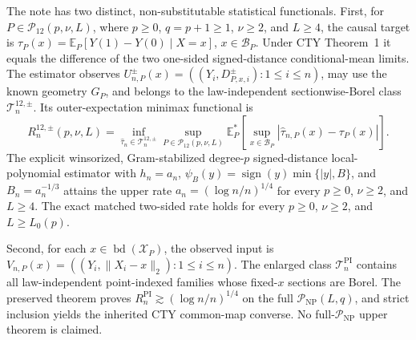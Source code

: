 The note has two distinct, non-substitutable statistical functionals.  First, for \(P\in\mathcal P_{12}(p,\nu,L)\), where \(p\geq0\), \(q=p+1\geq1\), \(\nu\geq2\), and \(L\geq4\), the causal target is \(\tau_P(x)=\mathbb E_P[Y(1)-Y(0)\mid X=x]\), \(x\in\mathcal B_P\).  Under CTY Theorem~1 it equals the difference of the two one-sided signed-distance conditional-mean limits.  The estimator observes \(U^{\pm}_{n,P}(x)=((Y_i,D^{\pm}_{P,x,i}):1\leq i\leq n)\), may use the known geometry \(G_P\), and belongs to the law-independent sectionwise-Borel class \(\mathcal T_n^{12,\pm}\).  Its outer-expectation minimax functional is
\[
 R_n^{12,\pm}(p,\nu,L)=\inf_{\widehat\tau_n\in\mathcal T_n^{12,\pm}}
 \sup_{P\in\mathcal P_{12}(p,\nu,L)}
 \mathbb E_P^*\!\left[\sup_{x\in\mathcal B_P}|\widehat\tau_{n,P}(x)-\tau_P(x)|\right].
\]
The explicit winsorized, Gram-stabilized degree-\(p\) signed-distance local-polynomial estimator with \(h_n=a_n\), \(\psi_B(y)=\operatorname{sign}(y)\min\{|y|,B\}\), and \(B_n=a_n^{-1/3}\) attains the upper rate \(a_n=(\log n/n)^{1/4}\) for every \(p\geq0\), \(\nu\geq2\), and \(L\geq4\).  The exact matched two-sided rate holds for every \(p\geq0\), \(\nu\geq2\), and \(L\geq L_0(p)\).

Second, for each \(x\in\operatorname{bd}(\mathcal X_P)\), the observed input is \(V_{n,P}(x)=((Y_i,\lVert X_i-x\rVert_2):1\leq i\leq n)\).  The enlarged class \(\mathcal T_n^{\mathrm{PI}}\) contains all law-independent point-indexed families whose fixed-\(x\) sections are Borel.  The preserved theorem proves \(R_n^{\mathrm{PI}}\gtrsim(\log n/n)^{1/4}\) on the full \(\mathcal P_{\mathrm{NP}}(L,q)\), and strict inclusion yields the inherited CTY common-map converse.  No full-\(\mathcal P_{\mathrm{NP}}\) upper theorem is claimed.
